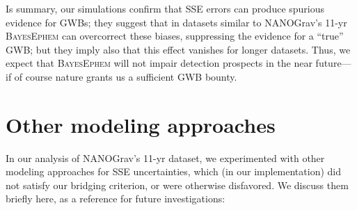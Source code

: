 \documentclass[reprint,
 amsmath,amssymb,
 aps,prd,floatfix,
]{revtex4-1}
\begin{document}
Is summary, our simulations confirm that SSE errors can produce spurious evidence for GWBs; they suggest that in datasets similar to NANOGrav's 11-yr \textsc{BayesEphem} can overcorrect these biases, suppressing the evidence for a ``true'' GWB; but they imply also that this effect vanishes for longer datasets. Thus, we expect that \textsc{BayesEphem} will not impair detection prospects in the near future---if of course nature grants us a sufficient GWB bounty.

\section{Other modeling approaches}
\label{sec:othermodels}

In our analysis of NANOGrav's 11-yr dataset, we experimented with other modeling approaches for SSE uncertainties, which (in our implementation) did not satisfy our bridging criterion, or were otherwise disfavored. We discuss them briefly here, as a reference for future investigations:
%
\end{document}
